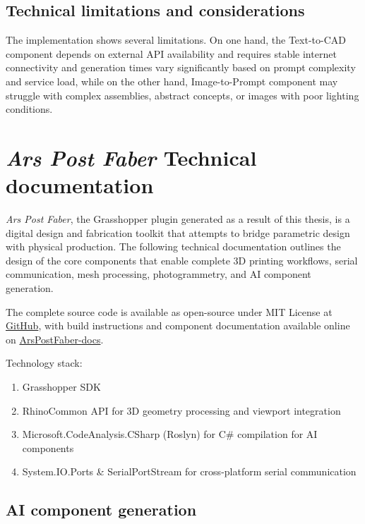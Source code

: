 \subsection{Technical limitations and considerations}

The implementation shows several limitations. On one hand, the Text-to-CAD component depends on external API availability and requires stable internet connectivity and generation times vary significantly based on prompt complexity and service load, while on the other hand, Image-to-Prompt component may struggle with complex assemblies, abstract concepts, or images with poor lighting conditions.

\clearpage
\section{\textit{Ars Post Faber} Technical documentation}

\textit{Ars Post Faber}, the Grasshopper plugin generated as a result of this thesis, is a digital design and fabrication toolkit that attempts to bridge parametric design with physical production. The following technical documentation outlines the design of the core components that enable complete 3D printing workflows, serial communication, mesh processing, photogrammetry, and AI component generation.

\vspace{0.5cm}

The complete source code is available as open-source under MIT License at \href{https://github.com/jmuozan/ArsPostFaber}{GitHub}, with build instructions and component documentation available online on \href{https://jmuozan.github.io/ArsPostFaber-docs/}{ArsPostFaber-docs}.

\vspace{0.5cm}

Technology stack:
\begin{enumerate}
\item Grasshopper SDK 
\item RhinoCommon API for 3D geometry processing and viewport integration
\item Microsoft.CodeAnalysis.CSharp (Roslyn) for C\# compilation for AI components
\item System.IO.Ports \& SerialPortStream for cross-platform serial communication
\end{enumerate}

\subsection{AI component generation}

